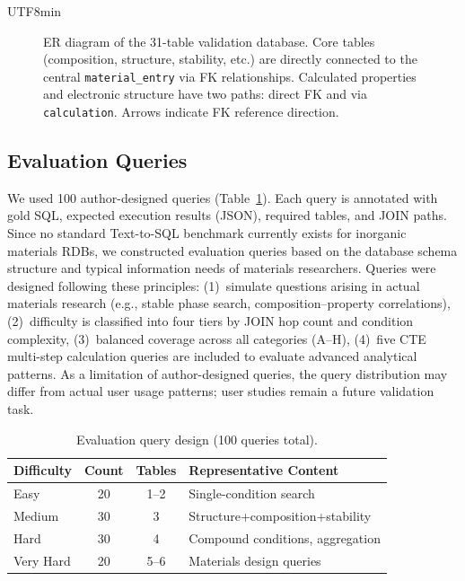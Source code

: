 \documentclass[sn-mathphys,Numbered]{sn-jnl}
\begin{document}
\begin{CJK}{UTF8}{min}
\begin{figure}[htbp]
{\begin{tikzpicture}
\end{tikzpicture}%
}%
\caption{ER diagram of the 31-table validation database.
  Core tables (composition, structure, stability, etc.) are directly
  connected to the central \texttt{material\_entry} via FK relationships.
  Calculated properties and electronic structure have two paths:
  direct FK and via \texttt{calculation}.
  Arrows indicate FK reference direction.}
\label{fig:er}
\end{figure}

\subsection{Evaluation Queries}

We used 100 author-designed queries (Table~\ref{tab:query_design}).
Each query is annotated with gold SQL, expected execution results
(JSON), required tables, and JOIN paths.
Since no standard Text-to-SQL benchmark currently exists for
inorganic materials RDBs, we constructed evaluation queries based on
the database schema structure and typical information needs of
materials researchers.
Queries were designed following these principles:
(1)~simulate questions arising in actual materials research
(e.g., stable phase search, composition--property correlations),
(2)~difficulty is classified into four tiers by JOIN hop count
and condition complexity,
(3)~balanced coverage across all categories (A--H),
(4)~five CTE multi-step calculation queries are included to
evaluate advanced analytical patterns.
As a limitation of author-designed queries, the query distribution
may differ from actual user usage patterns; user studies remain
a future validation task.

\begin{table}[t]
  \centering
  \caption{Evaluation query design (100 queries total).}
  \label{tab:query_design}
  \small
  \begin{tabular}{@{}lccl@{}}
    \toprule
    Difficulty & Count & Tables & Representative Content \\
    \midrule
    Easy & 20 & 1--2 & Single-condition search \\
    Medium & 30 & 3 & Structure+composition+stability \\
    Hard & 30 & 4 & Compound conditions, aggregation \\
    Very Hard & 20 & 5--6 & Materials design queries \\
    \bottomrule
  \end{tabular}
\end{table}


\end{CJK}
\end{document}
